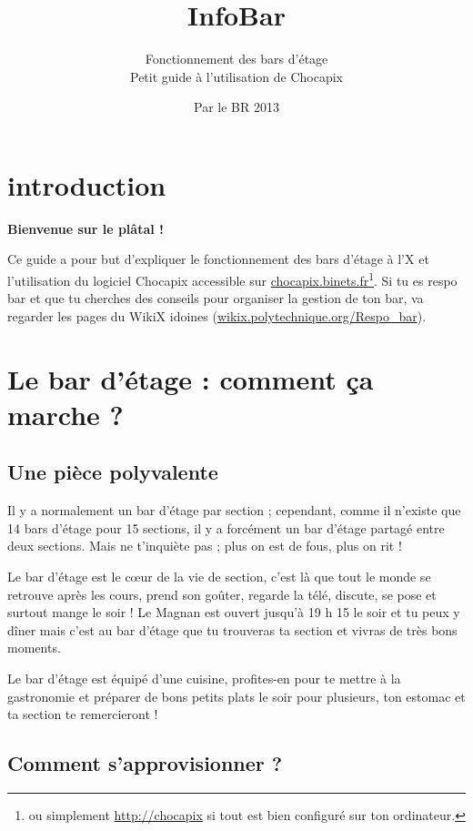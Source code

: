 \documentclass[12pt,french]{article}
\title{InfoBar}
\subtitle{Fonctionnement des bars d'étage\\Petit guide à l'utilisation de Chocapix}
\author{Par le BR 2013}
\begin{document}
\maketitle

\section*{introduction}

\begin{center}
\bfseries Bienvenue sur le plâtal ! 
\end{center}

Ce guide a pour but d'expliquer le fonctionnement des bars d'étage à l'X et l'utilisation du logiciel Chocapix accessible sur \url{chocapix.binets.fr}\footnote{ou simplement \url{http://chocapix} si tout est bien configuré sur ton ordinateur.}. Si tu es respo bar et que tu cherches des conseils pour organiser la gestion de ton bar, va regarder les pages du WikiX idoines (\url{wikix.polytechnique.org/Respo_bar}).


\tableofcontents

\clearpage

\section{Le bar d'étage : comment ça marche ?}

\subsection{Une pièce polyvalente}

Il y a normalement un bar d'étage par section ; cependant, comme il n'existe que 14 bars d'étage pour 15 sections, il y a forcément un bar d'étage partagé entre deux sections. Mais ne t'inquiète pas ; plus on est de fous, plus on rit !

Le bar d'étage est le cœur de la vie de section, c'est là que tout le monde se retrouve après les cours, prend son goûter, regarde la télé, discute, se pose et surtout mange le soir ! Le Magnan est ouvert jusqu'à 19 h 15 le soir et tu peux y dîner mais c'est au bar d'étage que tu trouveras ta section et vivras de très bons moments.

Le bar d'étage est équipé d'une cuisine, profites-en pour te mettre à la gastronomie et préparer de bons petits plats le soir pour plusieurs, ton estomac et ta section te remercieront ! 

\subsection{Comment s'approvisionner ?}
\end{document}

